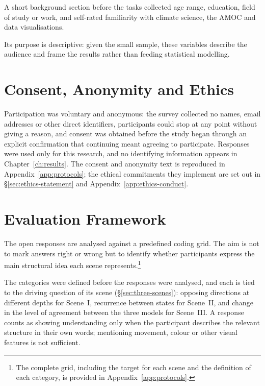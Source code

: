 A short background section before the tasks collected age range, education, field of study or work, and self-rated familiarity with climate science, the AMOC and data visualisations.

Its purpose is descriptive: given the small sample, these variables describe the audience and frame the results rather than feeding statistical modelling.

\section{Consent, Anonymity and Ethics}
\label{sec:eval-ethics}

Participation was voluntary and anonymous: the survey collected no names, email addresses or other direct identifiers, participants could stop at any point without giving a reason, and consent was obtained before the study began through an explicit confirmation that continuing meant agreeing to participate. Responses were used only for this research, and no identifying information appears in Chapter~\ref{ch:results}. The consent and anonymity text is reproduced in Appendix~\ref{app:protocols}; the ethical commitments they implement are set out in \S\ref{sec:ethics-statement} and Appendix~\ref{app:ethics-conduct}.

\section{Evaluation Framework}
\label{sec:eval-framework}

The open responses are analysed against a predefined coding grid. The aim is not to mark answers right or wrong but to identify whether participants express the main structural idea each scene represents.\footnote{The complete grid, including the target for each scene and the definition of each category, is provided in Appendix~\ref{app:protocols}.}

The categories were defined before the responses were analysed, and each is tied to the driving question of its scene (\S\ref{sec:three-scenes}): opposing directions at different depths for Scene~I, recurrence between states for Scene~II, and change in the level of agreement between the three models for Scene~III. A response counts as showing understanding only when the participant describes the relevant structure in their own words; mentioning movement, colour or other visual features is not sufficient.

